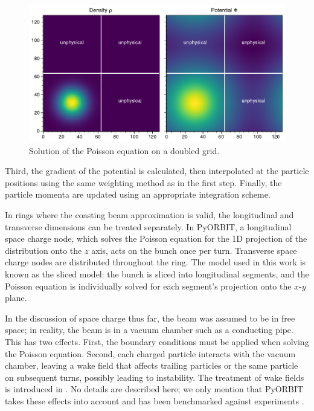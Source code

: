 \begin{figure}[!p]
    \centering
    \includegraphics[width=\textwidth]{Images/chapter3/poisson.pdf}
    \caption{Solution of the Poisson equation on a doubled grid.}
    \label{fig:poisson}
\end{figure}
%
Third, the gradient of the potential is calculated, then interpolated at the particle positions using the same weighting method as in the first step. Finally, the particle momenta are updated using an appropriate integration scheme.

In rings where the coasting beam approximation is valid, the longitudinal and transverse dimensions can be treated separately. In PyORBIT, a longitudinal space charge node, which solves the Poisson equation for the 1D projection of the distribution onto the $z$ axis, acts on the bunch once per turn. Transverse space charge nodes are distributed throughout the ring. The model used in this work is known as the sliced model: the bunch is sliced into longitudinal segments, and the Poisson equation is individually solved for each segment's projection onto the $x$-$y$ plane.

In the discussion of space charge thus far, the beam was assumed to be in free space; in reality, the beam is in a vacuum chamber such as a conducting pipe. This has two effects. First, the boundary conditions must be applied when solving the Poisson equation. Second, each charged particle interacts with the vacuum chamber, leaving a wake field that affects trailing particles or the same particle on subsequent turns, possibly leading to instability. The treatment of wake fields is introduced in \cite{Chao1993}. No details are described here; we only mention that PyORBIT takes these effects into account and has been benchmarked against experiments \cite{Holmes2011}.






